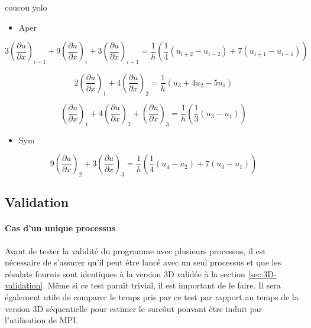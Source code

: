 coucou yolo
\begin{itemize}
\item Aper
\end{itemize}
 $$3\left( \frac{\partial u}{\partial x}\right) _{i-1} + 9\left( \frac{\partial u}{\partial x}\right) _{i} + 3\left( \frac{\partial u}{\partial x}\right) _{i+1} = \frac{1}{h}\left(  \frac{1}{4} \left( u_{i+2}-u_{i-2} \right) + 7 \left( u_{i+1} - u_{i-1} \right) \right) $$


$$2\left( \frac{\partial u}{\partial x}\right) _{1} + 4\left( \frac{\partial u}{\partial x}\right) _{2} = \frac{1}{h}\left( u_3 + 4u_2 - 5u_1 \right)$$

$$\left( \frac{\partial u}{\partial x}\right) _{1} + 4\left( \frac{\partial u}{\partial x}\right) _{2} + \left( \frac{\partial u}{\partial x}\right) _{3} = \frac{1}{h}\left( \frac{1}{3} \left( u_3 - u_1 \right) \right)$$

\begin{itemize}
\item Sym
\end{itemize}

$$9\left( \frac{\partial u}{\partial x}\right) _{2} + 3\left( \frac{\partial u}{\partial x}\right) _{3} = \frac{1}{h}\left( \frac{1}{4} \left( u_4 - u_2 \right) + 7 \left( u_3 - u_1 \right) \right)$$

\subsection{Validation}

\paragraph{Cas d'un unique processus}Avant de tester la validité du programme avec plusieurs processus, il est nécessaire de s'assurer qu'il peut être lancé avec un seul processus et que les résulats fournis sont identiques à la version 3D validée à la section \ref{sec:3D-validation}. Même si ce test paraît trivial, il est important de le faire. Il sera également utile de comparer le temps pris par ce test par rapport au temps de la version 3D séquentielle pour estimer le surcôut pouvant être induit par l'utilisation de MPI.

